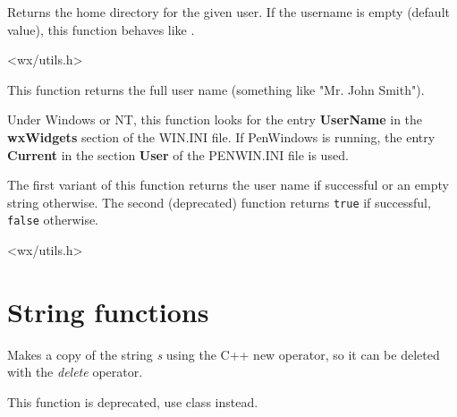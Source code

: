 \label{wxgetuserhome}


Returns the home directory for the given user. If the username is empty
(default value), this function behaves like
.


<wx/utils.h>


\label{wxgetusername}



This function returns the full user name (something like "Mr. John Smith").

Under Windows or NT, this function looks for the entry {\bf UserName}\rtfsp
in the {\bf wxWidgets} section of the WIN.INI file. If PenWindows
is running, the entry {\bf Current} in the section {\bf User} of
the PENWIN.INI file is used.

The first variant of this function returns the user name if successful or an
empty string otherwise. The second (deprecated) function returns {\tt true}
if successful, {\tt false} otherwise.




<wx/utils.h>



\section{String functions}\label{stringfunctions}


\label{copystring}


Makes a copy of the string {\it s} using the C++ new operator, so it can be
deleted with the {\it delete} operator.

This function is deprecated, use  class instead.


\label{wxgettranslation}


